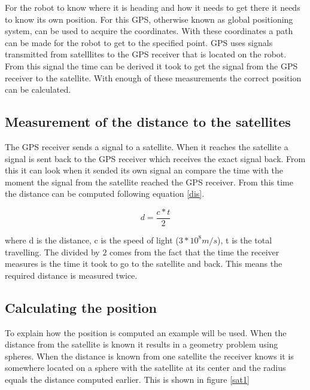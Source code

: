 \documentclass{article}
\begin{document}
For the robot to know where it is heading and how it needs to get there it needs to know its own position. For this GPS, otherwise known as global positioning system, can be used to acquire the coordinates. With these coordinates a path can be made for the robot to get to the specified point. GPS uses signals transmitted from satelllites to the GPS receiver that is located on the robot. From this signal the time can be derived it took to get the signal from the GPS receiver to the satellite. With enough of these measurements the correct position can be calculated.

\subsection{Measurement of the distance to the satellites}

The GPS receiver sends a signal to a satellite. When it reaches the satellite a signal is sent back to the GPS receiver which receives the exact signal back. From this it can look when it sended its own signal an compare the time with the moment the signal from the satellite reached the GPS receiver. From this time the distance can be computed following equation \ref{dis}.

\begin{equation}
d = \frac{c*t}{2}
\label{dis}
\end{equation}

where d is the distance, c is the speed of light ($3*10^8 m/s$), t is the total travelling. The divided by $2$ comes from the fact that the time the receiver measures is the time it took to go to the satellite and back. This means the required distance is measured twice.

\subsection{Calculating the position}

To explain how the position is computed an example will be used. When the distance from the satellite is known it results in a geometry problem using spheres. When the distance is known from one satellite the receiver knows it is somewhere located on a sphere with the satellite at its center and the radius equals the distance computed earlier. This is shown in figure \ref{sat1}
\end{document}
